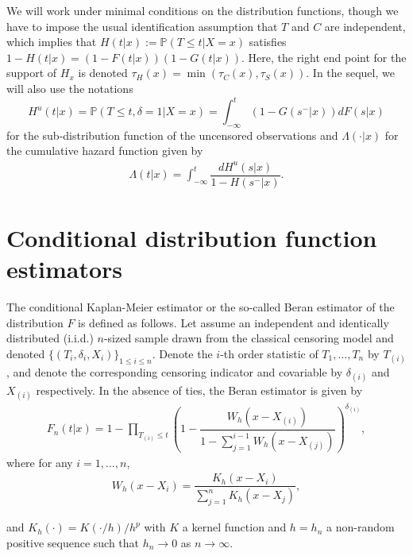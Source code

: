 \documentclass[12pt]{article}
\begin{document}
We will work under minimal conditions on the distribution functions, though we have to impose the usual identification assumption that $T$ and $C$ are independent, which implies that $H(t|x):=\mathbb{P}(T \le t|X=x)$ satisfies $1-H(t|x)=(1-F(t|x))(1-G(t|x))$. Here, the right end point for the support of $H_x$ is denoted $\tau_H(x)=\min(\tau_C(x),\tau_S(x))$. In the sequel, we will also use the notations $$H^u(t|x)=\mathbb{P}(T\leq t,\delta=1|X=x)=\int_{-\infty}^t (1-G(s^-|x)) dF(s|x)$$ for the sub-distribution function of the uncensored observations and $\Lambda(\cdot|x)$ for the cumulative hazard function given by
\begin{eqnarray*} 
\Lambda(t|x)=\int_{-\infty}^t \dfrac{dH^u(s|x)}{1-H(s^-|x)}.
\end{eqnarray*} 

\newpage
\section{Conditional distribution function estimators}
\label{section_cdf}

\noindent
The conditional Kaplan-Meier estimator or the so-called Beran estimator of the distribution $F$ is defined as follows. Let assume an independent and identically distributed (i.i.d.) $n$-sized sample drawn from the classical censoring model and denoted $\{(T_i,\delta_i,X_i)\}_{1\leq i\leq n}$. Denote the $i$-th order statistic of $T_1,\ldots,T_n$ by $T_{(i)}$, and denote the corresponding censoring indicator and covariable by $\delta_{(i)}$ and $X_{(i)}$ respectively. In the absence of ties, the Beran estimator is given by
\begin{eqnarray*}
F_n(t|x)=1-\prod_{T_{(i)}\leq t}\left(1-\dfrac{W_h(x-X_{(i)})}{1-\sum_{j=1}^{i-1}W_h(x-X_{(j)})}\right)^{\delta_{(i)}},
\end{eqnarray*}
where for any $i=1,\ldots,n$,
\begin{eqnarray*}
W_h(x-X_i)=\dfrac{K_h(x-X_i)}{\sum_{j=1}^nK_h(x-X_j)},
\end{eqnarray*}


and $K_h(\cdot)=K(\cdot/h)/h^p$ with $K$ a kernel function and $h=h_n$ a non-random positive sequence such that $h_n\rightarrow 0$ as $n\rightarrow \infty$.\\
\end{document}
